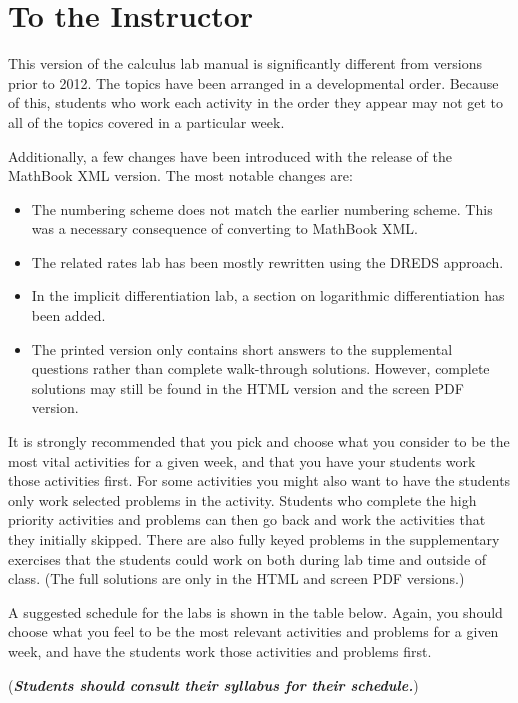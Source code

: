 \documentclass[12pt,]{book}
\newcommand{\alert}[1]{\textbf{\textit{#1}}}
\theoremstyle{plain}
\theoremstyle{definition}
\theoremstyle{definition}
\theoremstyle{definition}
\theoremstyle{definition}
\theoremstyle{definition}
\numberwithin{equation}{section}
\begin{document}
\chapter*{To the Instructor}\label{to-the-instructor}
This version of the calculus lab manual is significantly different from versions prior to 2012. The topics have been arranged in a developmental order. Because of this, students who work each activity in the order they appear may not get to all of the topics covered in a particular week.%
\par
Additionally, a few changes have been introduced with the release of the MathBook XML version. The most notable changes are:%
\leavevmode%
\begin{itemize}[label=\textbullet]
\item{}The numbering scheme does not match the earlier numbering scheme. This was a necessary consequence of converting to MathBook XML.%
\item{}The related rates lab has been mostly rewritten using the DREDS approach.%
\item{}In the implicit differentiation lab, a section on logarithmic differentiation has been added.%
\item{}The printed version only contains short answers to the supplemental questions rather than complete walk-through solutions. However, complete solutions may still be found in the HTML version and the screen PDF version.%
\end{itemize}
\par
It is strongly recommended that you pick and choose what you consider to be the most vital activities for a given week, and that you have your students work those activities first. For some activities you might also want to have the students only work selected problems in the activity. Students who complete the high priority activities and problems can then go back and work the activities that they initially skipped. There are also fully keyed problems in the supplementary exercises that the students could work on both during lab time and outside of class. (The full solutions are only in the HTML and screen PDF versions.)%
\par
A suggested schedule for the labs is shown in the table below. Again, you should choose what you feel to be the most relevant activities and problems for a given week, and have the students work those activities and problems first.%
\par
(\alert{Students should consult their syllabus for their schedule.})%
\end{document}
